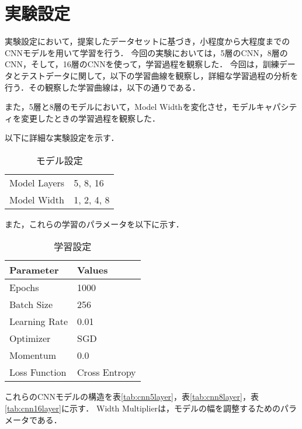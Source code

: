 \newpage

\section{実験設定}
\label{sec:experiment_settings}
実験設定において，提案したデータセットに基づき，小程度から大程度までのCNNモデルを用いて学習を行う．
今回の実験においては，5層のCNN，8層のCNN，そして，16層のCNNを使って，学習過程を観察した．
今回は，訓練データとテストデータに関して，以下の学習曲線を観察し，詳細な学習過程の分析を行う．その観察した学習曲線は，以下の通りである．


また，5層と8層のモデルにおいて，Model Widthを変化させ，モデルキャパシティを変更したときの学習過程を観察した．

以下に詳細な実験設定を示す．

\begin{table}[ht]
    \centering
    \caption{モデル設定}
    \begin{tabular}{ll}
        \midrule
        Model Layers & 5, 8, 16 \\
        Model Width & 1, 2, 4, 8 \\
        \bottomrule
    \end{tabular}
    \label{tab:model_settings}
\end{table}

また，これらの学習のパラメータを以下に示す．

\begin{table}[ht]
    \centering
    \caption{学習設定}
    \begin{tabular}{ll}
        \toprule
        \textbf{Parameter} & \textbf{Values} \\
        \midrule
        Epochs & 1000 \\
        Batch Size & 256 \\
        Learning Rate & 0.01 \\
        Optimizer & SGD \\
        Momentum & 0.0 \\
        Loss Function & Cross Entropy \\
        \bottomrule
    \end{tabular}
    \label{tab:training_settings}
\end{table}

これらのCNNモデルの構造を表\ref{tab:cnn5layer}，表\ref{tab:cnn8layer}，表\ref{tab:cnn16layer}に示す．
Width Multiplierは，モデルの幅を調整するためのパラメータである．

